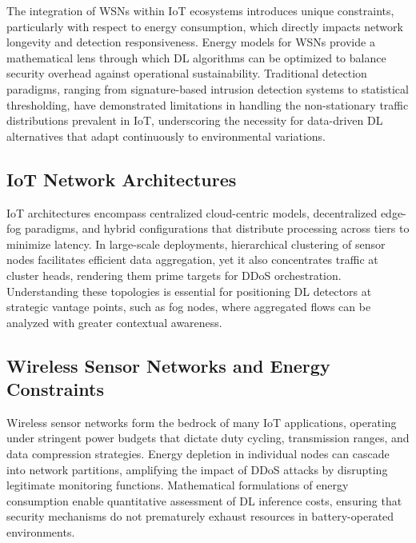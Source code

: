 \documentclass[12pt]{article}
\begin{document}
The integration of WSNs within IoT ecosystems introduces unique constraints, particularly with respect to energy consumption, which directly impacts network longevity and detection responsiveness. Energy models for WSNs provide a mathematical lens through which DL algorithms can be optimized to balance security overhead against operational sustainability. Traditional detection paradigms, ranging from signature-based intrusion detection systems to statistical thresholding, have demonstrated limitations in handling the non-stationary traffic distributions prevalent in IoT, underscoring the necessity for data-driven DL alternatives that adapt continuously to environmental variations.

\subsection{IoT Network Architectures}

IoT architectures encompass centralized cloud-centric models, decentralized edge-fog paradigms, and hybrid configurations that distribute processing across tiers to minimize latency. In large-scale deployments, hierarchical clustering of sensor nodes facilitates efficient data aggregation, yet it also concentrates traffic at cluster heads, rendering them prime targets for DDoS orchestration. Understanding these topologies is essential for positioning DL detectors at strategic vantage points, such as fog nodes, where aggregated flows can be analyzed with greater contextual awareness.
\subsection{Wireless Sensor Networks and Energy Constraints}
Wireless sensor networks form the bedrock of many IoT applications, operating under stringent power budgets that dictate duty cycling, transmission ranges, and data compression strategies. Energy depletion in individual nodes can cascade into network partitions, amplifying the impact of DDoS attacks by disrupting legitimate monitoring functions. Mathematical formulations of energy consumption enable quantitative assessment of DL inference costs, ensuring that security mechanisms do not prematurely exhaust resources in battery-operated environments.
\end{document}
